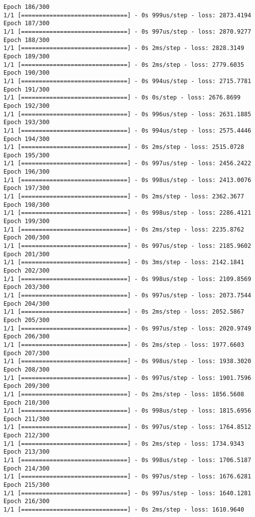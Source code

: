 \documentclass[11pt]{article}
\begin{document}
\begin{Verbatim}[commandchars=\\\{\}]
Epoch 186/300
1/1 [==============================] - 0s 999us/step - loss: 2873.4194
Epoch 187/300
1/1 [==============================] - 0s 997us/step - loss: 2870.9277
Epoch 188/300
1/1 [==============================] - 0s 2ms/step - loss: 2828.3149
Epoch 189/300
1/1 [==============================] - 0s 2ms/step - loss: 2779.6035
Epoch 190/300
1/1 [==============================] - 0s 994us/step - loss: 2715.7781
Epoch 191/300
1/1 [==============================] - 0s 0s/step - loss: 2676.8699
Epoch 192/300
1/1 [==============================] - 0s 996us/step - loss: 2631.1885
Epoch 193/300
1/1 [==============================] - 0s 994us/step - loss: 2575.4446
Epoch 194/300
1/1 [==============================] - 0s 2ms/step - loss: 2515.0728
Epoch 195/300
1/1 [==============================] - 0s 997us/step - loss: 2456.2422
Epoch 196/300
1/1 [==============================] - 0s 998us/step - loss: 2413.0076
Epoch 197/300
1/1 [==============================] - 0s 2ms/step - loss: 2362.3677
Epoch 198/300
1/1 [==============================] - 0s 998us/step - loss: 2286.4121
Epoch 199/300
1/1 [==============================] - 0s 2ms/step - loss: 2235.8762
Epoch 200/300
1/1 [==============================] - 0s 997us/step - loss: 2185.9602
Epoch 201/300
1/1 [==============================] - 0s 3ms/step - loss: 2142.1841
Epoch 202/300
1/1 [==============================] - 0s 998us/step - loss: 2109.8569
Epoch 203/300
1/1 [==============================] - 0s 997us/step - loss: 2073.7544
Epoch 204/300
1/1 [==============================] - 0s 2ms/step - loss: 2052.5867
Epoch 205/300
1/1 [==============================] - 0s 997us/step - loss: 2020.9749
Epoch 206/300
1/1 [==============================] - 0s 2ms/step - loss: 1977.6603
Epoch 207/300
1/1 [==============================] - 0s 998us/step - loss: 1938.3020
Epoch 208/300
1/1 [==============================] - 0s 997us/step - loss: 1901.7596
Epoch 209/300
1/1 [==============================] - 0s 2ms/step - loss: 1856.5608
Epoch 210/300
1/1 [==============================] - 0s 998us/step - loss: 1815.6956
Epoch 211/300
1/1 [==============================] - 0s 997us/step - loss: 1764.8512
Epoch 212/300
1/1 [==============================] - 0s 2ms/step - loss: 1734.9343
Epoch 213/300
1/1 [==============================] - 0s 998us/step - loss: 1706.5187
Epoch 214/300
1/1 [==============================] - 0s 997us/step - loss: 1676.6281
Epoch 215/300
1/1 [==============================] - 0s 997us/step - loss: 1640.1281
Epoch 216/300
1/1 [==============================] - 0s 2ms/step - loss: 1610.9640

\end{Verbatim}
\end{document}
